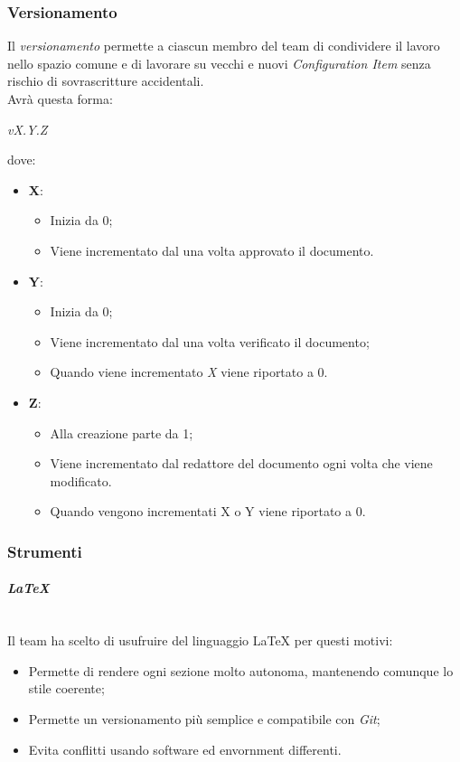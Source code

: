 	\subsubsection{Versionamento}
	Il \emph{versionamento} permette a ciascun membro del team di condividere il lavoro nello spazio comune e di lavorare su vecchi e nuovi \emph{Configuration Item} senza rischio di sovrascritture accidentali.
	\\Avrà questa forma:
	\begin{center}
		\emph{vX.Y.Z}
	\end{center}
	dove:
	\begin{itemize}
		\item \textbf{X}:
		\begin{itemize}
			\item Inizia da 0;
			\item Viene incrementato dal \RdP{} una volta approvato il documento.
		\end{itemize}
		\item \textbf{Y}:
		\begin{itemize}
			\item Inizia da 0;
			\item Viene incrementato dal \ver{} una volta verificato il documento;
			\item Quando viene incrementato \emph{X} viene riportato a 0.
		\end{itemize}
		\item \textbf{Z}:
		\begin{itemize}
			\item Alla creazione parte da 1;
			\item Viene incrementato dal redattore del documento ogni volta che viene modificato.
			\item Quando vengono incrementati X o Y viene riportato a 0.
		\end{itemize}
	\end{itemize}
	\subsubsection{Strumenti}
			\paragraph{\textbf{\emph{\LaTeX}}}
			~\\Il team ha scelto di usufruire del linguaggio \LaTeX{} per questi motivi:
			\begin{itemize}
				\item Permette di rendere ogni sezione molto autonoma, mantenendo comunque lo stile coerente;
				\item Permette un versionamento più semplice e compatibile con \emph{Git};
				\item Evita conflitti usando software ed envornment differenti.
			\end{itemize}
		
